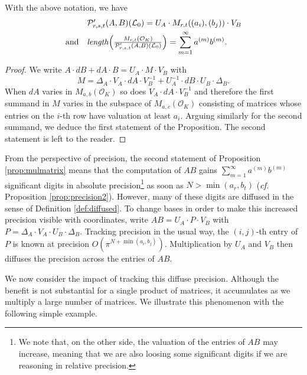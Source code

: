 \documentclass{sig-alternate}
\renewcommand{\O}{\mathcal O}
\begin{document}
\begin{prop}
\label{prop:mulmatrix}
With the above notation, we have
\[
\begin{array}{rl}
& \mathcal P'_{r,s,t}(A,B)(\mathcal L_0)
= U_A \cdot M_{r,t}((a_i),(b_j)) \cdot V_B \smallskip \\
\text{and} &
\text{\emph{length}}\Big(\frac{M_{r,t}(\O_K)}{\mathcal P'_{r,s,t}(A,B)(\mathcal L_0) }
\Big) =
\displaystyle 
\sum_{m=1}^\infty a^{(m)} b^{(m)}.
\end{array}
\]
\end{prop}

\begin{proof}
We write $A \cdot dB + dA \cdot B = U_A \cdot M \cdot V_B$ with
$$M = \Delta_A \cdot V_A \cdot dA \cdot V_B^{-1} 
+ U_A^{-1} \cdot dB \cdot U_B \cdot \Delta_B.$$
When $dA$ varies in $M_{a,b}(\O_K)$ so does $V_A \cdot dA \cdot V_B^{-1}$
and therefore the first summand in $M$ varies in the subspace of 
$M_{a,c}(\O_K)$ consisting of matrices whose entries on the $i$-th
row have valuation at least $a_i$. Arguing similarly for the second
summand, we deduce the first statement of the Proposition. The second
statement is left to the reader.
\end{proof}

From the perspective of precision, the second statement of Proposition \ref{prop:mulmatrix}
means that the computation of $AB$ gains $\sum_{m=1}^\infty 
a^{(m)} b^{(m)}$ significant digits in absolute precision\footnote{We 
note that, on the other side, the valuation of the entries of $AB$ may 
increase, meaning that we are also loosing some significant digits if we 
are reasoning in relative precision.} as soon as $N > \min(a_r, b_t)$ 
(\emph{cf.} Proposition \ref{prop:precision2}). However, many of these digits are 
diffused in the sense of Definition \ref{def:diffused}.
To change bases in order to make this increased precision visible
with coordinates, write 
$AB = U_A \cdot P \cdot V_B$ with
$P = \Delta_A \cdot V_A \cdot U_B \cdot \Delta_B$.
Tracking precision in the usual way, the $(i,j)$-th entry
of $P$ is known at precision $O(\pi^{N + \min(a_i,b_j)})$.  Multiplication by
$U_A$ and $V_B$ then diffuses the precision across the entries of $AB$.

\smallskip

We now consider the impact of tracking this diffuse precision.
Although the benefit is not substantial for
a single product of matrices, it accumulates as we multiply a large
number of matrices.  We illustrate this phenomenon with the following simple
example.
\end{document}
